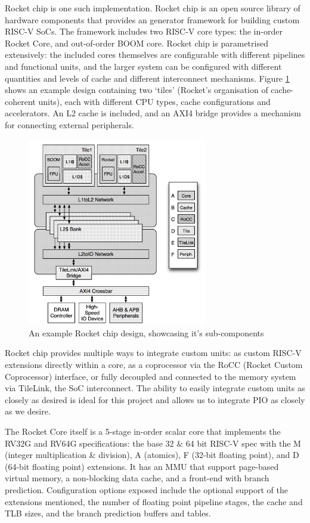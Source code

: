 Rocket chip is one such implementation. Rocket chip is an open source library of hardware components that provides an generator framework for building custom RISC-V SoCs. The framework includes two RISC-V core types: the in-order Rocket Core, and out-of-order BOOM core. Rocket chip is parametrised extensively: the included cores themselves are configurable with different pipelines and functional units, and the larger system can be configured with different quantities and levels of cache and different interconnect mechanisms. Figure \ref{fig:rocket} shows an example design containing two `tiles' (Rocket's organisation of cache-coherent units), each with different CPU types, cache configurations and accelerators. An L2 cache is included, and an AXI4 bridge provides a mechanism for connecting external peripherals.

\begin{figure}[h!]
    \centering
    \includegraphics[width=0.7\textwidth]{../img/rocket-chip.png}
    \caption{An example Rocket chip design, showcasing it's sub-components \cite{rocketchip}}
    \label{fig:rocket}
\end{figure}

Rocket chip provides multiple ways to integrate custom units: as custom RISC-V extensions directly within a core, as a coprocessor via the RoCC (Rocket Custom Coprocessor) interface, or fully decoupled and connected to the memory system via TileLink, the SoC interconnect. The ability to easily integrate custom units as closely as desired is ideal for this project and allows us to integrate PIO as closely as we desire.

The Rocket Core itself is a 5-stage in-order scalar core that implements the RV32G and RV64G specifications: the base 32 \& 64 bit RISC-V spec with the M (integer multiplication \& division), A (atomics), F (32-bit floating point), and D (64-bit floating point) extensions. It has an MMU that support page-based virtual memory, a non-blocking data cache, and a front-end with branch prediction. Configuration options exposed include the optional support of the extensions mentioned, the number of floating point pipeline stages, the cache and TLB sizes, and the branch prediction buffers and tables.

